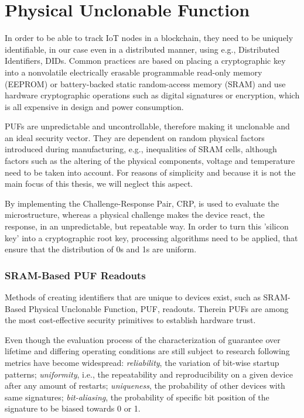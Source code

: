 \section{Physical Unclonable Function} %
\label{sec:Physical Unclonable Function}

In order to be able to track IoT nodes in a blockchain, they need to be uniquely identifiable, in our case even in a
distributed manner, using e.g., Distributed Identifiers, DIDs.
Common practices are based on placing a cryptographic key into a nonvolatile electrically erasable programmable
read-only memory (EEPROM) or battery-backed static random-access memory (SRAM) and use hardware cryptographic operations
such as digital signatures or encryption, which is all expensive in design and power consumption. \cite{herder2014physical}

PUFs are unpredictable and uncontrollable, therefore making it unclonable and an ideal security vector. They are
dependent on random physical factors introduced during manufacturing, e.g., inequalities of SRAM cells, although factors
such as the altering of the physical components, voltage and temperature need to be taken into account. \cite{vinagrero2023sram}
For reasons of simplicity and because it is not the main focus of this thesis, we will neglect this aspect.

By implementing the Challenge-Response Pair, CRP, is used to evaluate the microstructure, whereas a physical challenge
makes the device react, the response, in an unpredictable, but repeatable way.
In order to turn this 'silicon key' into a cryptographic root key, processing algorithms need to be applied, that ensure
that the distribution of 0s and 1s are uniform. \cite{herder2014physical}

\subsubsection{SRAM-Based PUF Readouts} %
\label{sec:SRAM-Based PUF Readouts}

Methods of creating identifiers that are unique to devices exist, such as SRAM-Based Physical Unclonable Function, PUF,
readouts. Therein PUFs are among the most cost-effective security primitives to establish hardware trust.
\cite{holcomb2007initial}

Even though the evaluation process of the characterization of guarantee over lifetime and differing operating conditions
are still subject to research following metrics have become widespread: \textit{reliability}, the variation of bit-wise
startup patterns; \textit{uniformity}, i.e., the repeatability and reproducibility on a given device after any amount of
restarts; \textit{uniqueness}, the probability of other devices with same signatures; \textit{bit-aliasing}, the
probability of specific bit position of the signature to be biased towards 0 or 1. \cite{vinagrero2023sram}


